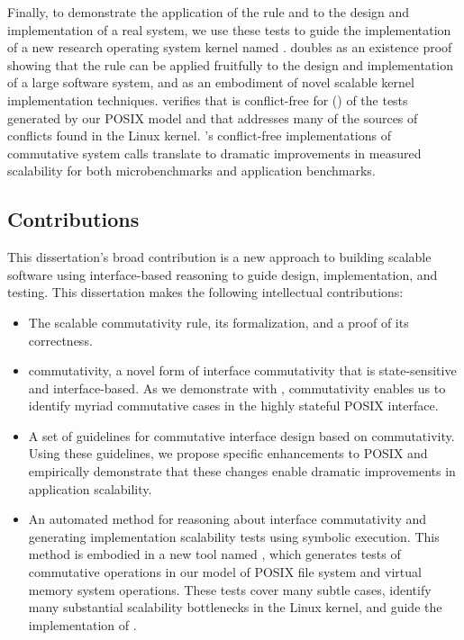 Finally, to demonstrate the application of the rule and \tool to the
design and implementation of a real system, we use these tests to
guide the implementation of a new research operating system kernel
named \sys.
%
\sys doubles as an existence proof showing that the rule can be
applied fruitfully to the design and implementation of a large
software system, and as an embodiment of novel scalable kernel
implementation techniques.
%
%
\tool verifies that \sys is conflict-free for
()
of the tests generated by our POSIX model and that \sys addresses many
of the
sources of conflicts found in the Linux kernel.
%
\sys's conflict-free implementations of
commutative system calls translate to dramatic improvements in
measured scalability for both microbenchmarks and application
benchmarks.


\subsection{Contributions}

This dissertation's broad contribution is a new approach to building
scalable software using interface-based reasoning to guide design,
implementation, and testing.  This dissertation makes the following
intellectual contributions:

\begin{itemize}

\item The scalable commutativity rule, its formalization, and a proof
  of its correctness.

\item \SIM commutativity, a novel form of interface commutativity that
  is state-sensitive and interface-based.  As we demonstrate with
  \tool, \SIM commutativity enables us to identify myriad commutative
  cases in the highly stateful POSIX interface.

\item A set of guidelines for commutative interface design based on
  \SIM commutativity.  Using these guidelines, we propose specific
  enhancements to POSIX and empirically demonstrate that these changes
  enable dramatic improvements in application scalability.

\item An automated method for reasoning about interface commutativity
  and generating implementation scalability tests using symbolic
  execution.  This method is embodied in a new tool named \tool, which
  generates  tests of commutative operations
  in our model of  POSIX file system and
  virtual memory system operations.  These tests cover many subtle
  cases, identify many substantial scalability bottlenecks in the
  Linux kernel, and guide the implementation of \sys.

\end{itemize}

